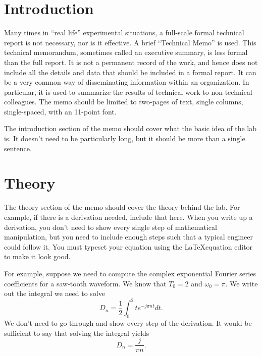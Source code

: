 \documentclass[11pt]{texMemo-gibbons}
\begin{document}
\maketitle

\section{Introduction}
\label{sec:introduction}

Many times in ``real life'' experimental situations, a full-scale formal technical report is not necessary, nor is it effective. A brief ``Technical Memo'' is used. This technical memorandum, sometimes called an executive summary, is less formal than the full report. It is not a permanent record of the work, and hence does not include all the details and data that should be included in a formal report. It can be a very common way of disseminating information within an organization. In particular, it is used to summarize the results of technical work to non-technical colleagues. The memo should be limited to two-pages of text, single columns, single-spaced, with an 11-point font.  

The introduction section of the memo should cover what the basic idea of the lab is.  It doesn't need to be particularly long, but it should be more than a single sentence.  

\section{Theory}
\label{sec:theory}

The theory section of the memo should cover the theory behind the lab.  For example, if there is a derivation needed, include that here.  When you write up a derivation, you don't need to show every single step of mathematical manipulation, but you need to include enough steps such that a typical engineer could follow it.  You must typeset your equation using the \LaTeX  equation editor to make it look good.

For example, suppose we need to compute the complex exponential Fourier series coefficients for a saw-tooth waveform.  We know that $T_0=2$ and $\omega_0=\pi$.  We write out the integral we need to solve
\begin{equation}
  \label{eq:1}
  D_n = \frac{1}{2}\int^2_0 t e^{-j\pi n t} dt.  
\end{equation}
We don't need to go through and show every step of the derivation.  It would be sufficient to say that solving the integral yields
\begin{equation}
  \label{eq:2}
  D_n = \frac{j}{\pi n}.
\end{equation}
\end{document}
